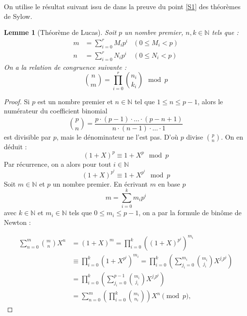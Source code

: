 \documentclass{article}
\theoremstyle{definition}
\theoremstyle{plain}
\theoremstyle{plain}
\theoremstyle{plain}
\newtheorem{lemma}[subsubsection]{Lemme}
\theoremstyle{plain}
\theoremstyle{definition}
\theoremstyle{plain}
\theoremstyle{plain}
\begin{document}
On utilise le résultat suivant issu de \cite{fine1947binomial} dans la preuve du point \ref{S1} des théorèmes de Sylow.

\begin{lemma}[Théorème de Lucas]\label{thm:lucas}
	Soit \( p \) un nombre premier, \( n,k \in \mathbb{N} \) tels que :
	\begin{align*}
		m &= \sum_{i=0}^{r} M_{i}p^{i} &(0 \leq M_i < p)\\
		n &= \sum_{i=0}^{r} N_{i}p^{i} &(0 \leq N_i < p)
	\end{align*}
	On a la relation de congruence suivante :
	\begin{equation*}
		\binom{n}{m} = \prod_{i=0}^{r} \binom{n_i}{k_i} \mod p 
	\end{equation*}
\end{lemma}

\begin{proof}
	Si \( p \) est un nombre premier et \( n \in \mathbb{N}\) tel que \( 1 \leq n \leq p-1 \), alors le numérateur du coefficient binomial 
\begin{equation*}
	\binom{p}{n} = \frac{p \cdot (p-1) \cdot \ldots \cdot (p-n+1)}{n \cdot (n-1) \cdot \ldots \cdot 1}
\end{equation*}
est divisible par \( p \), mais le dénominateur ne l'est pas. D'où \( p \) divise \( \binom{p}{n} \). On en déduit : 
\begin{equation*}
	(1 + X)^p \equiv 1 + X^p \mod{p}
\end{equation*}
Par récurrence, on a alors pour tout \( i \in \mathbb{N} \)
\begin{equation*}
	(1 + X)^{p^i} \equiv 1 + X^{p^i} \mod{p}
\end{equation*}
Soit \( m \in \mathbb{N}\) et \( p \) un nombre premier. 
En écrivant \( m \) en base \( p \) 
\begin{equation*}
	m = \sum_{i=0}^{k} m_i p^i
\end{equation*}
avec \( k \in \mathbb{N} \) et \( m_i \in \mathbb{N} \) tels que \( 0 \leq m_i \leq p-1 \), on a par la formule de binôme de Newton :

\begin{align*}
	\sum_{n=0}^{m} \binom{m}{n} X^n &= (1+X)^m = \prod_{i=0}^{k} \left((1+X)^{p^i}\right)^{m_i} \\
&\equiv \prod_{i=0}^{k} \left(1 + X^{p^i}\right)^{m_i} = \prod_{i=0}^{k} \left(\sum_{j_i=0}^{m_i} \binom{m_i}{j_i} X^{j_i p^i}\right) \\
&= \prod_{i=0}^{k} \left(\sum_{j_i=0}^{p-1} \binom{m_i}{j_i} X^{j_i p^i}\right) \\
&= \sum_{n=0}^{m} \left(\prod_{i=0}^{k} \binom{m_i}{n_i}\right) X^n \pmod{p},
\end{align*}
\end{proof}
\end{document}
